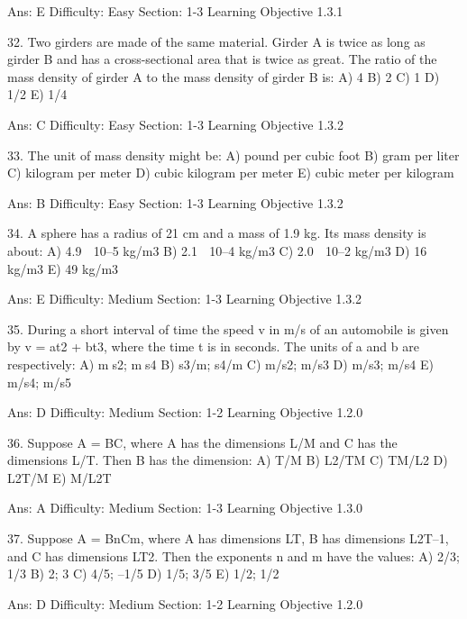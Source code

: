 Ans: E
Difficulty: Easy
Section: 1-3
Learning Objective 1.3.1

32.  Two girders are made of the same material.  Girder A is twice as long as girder B and has a cross-sectional area that is twice as great.  The ratio of the mass density of girder A to the mass density of girder B is:
A)  4
B)  2
C)  1
D)  1/2
E)  1/4

Ans:  C
Difficulty:  Easy
Section:  1-3
Learning Objective 1.3.2

33.  The unit of mass density might be:
A)  pound per cubic foot
B)  gram per liter
C)  kilogram per meter
D)  cubic kilogram per meter
E)  cubic meter per kilogram

Ans:  B
Difficulty:  Easy
Section:  1-3
Learning Objective 1.3.2

34.  A sphere has a radius of 21 cm and a mass of 1.9 kg.  Its mass density is about:
A)  4.9  10–5 kg/m3
B)  2.1  10–4 kg/m3
C)  2.0  10–2 kg/m3
D)  16 kg/m3
E)  49 kg/m3

Ans:  E
Difficulty:  Medium
Section:  1-3
Learning Objective 1.3.2

35.  During a short interval of time the speed v in m/s of an automobile is given by v = at2 + bt3, where the time t is in seconds. The units of a and b are respectively: 
A)  ms2; ms4
B)  s3/m; s4/m 
C)  m/s2; m/s3
D)  m/s3; m/s4
E)  m/s4; m/s5

Ans:  D
Difficulty:  Medium
Section:  1-2
Learning Objective 1.2.0


36.  Suppose A = BC, where A has the dimensions L/M and C has the dimensions L/T. Then B has the dimension: 
A)  T/M 
B)  L2/TM 
C)  TM/L2
D)  L2T/M 
E)  M/L2T 

Ans:  A
Difficulty:  Medium
Section:  1-3
Learning Objective 1.3.0


37.  Suppose A = BnCm, where A has dimensions LT, B has dimensions L2T–1, and C has dimensions LT2. Then the exponents n and m have the values: 
A)  2/3; 1/3 
B)  2; 3 
C)  4/5; –1/5 
D)  1/5; 3/5 
E)  1/2; 1/2  

Ans:  D
Difficulty:  Medium
Section:  1-2
Learning Objective 1.2.0

